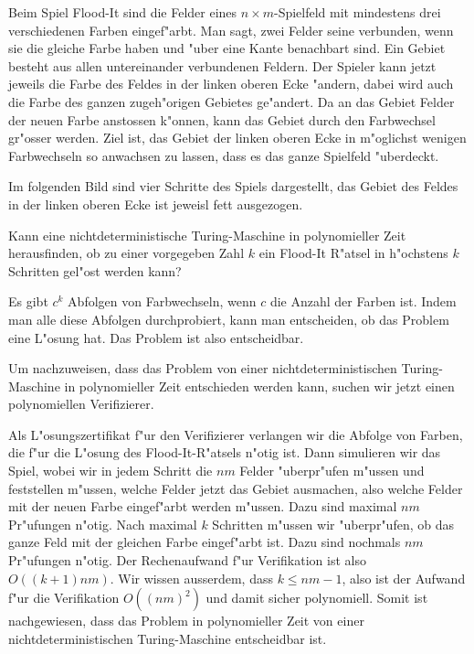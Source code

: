 Beim Spiel Flood-It sind die Felder eines $n\times m$-Spielfeld mit 
mindestens drei verschiedenen Farben eingef"arbt.
Man sagt, zwei Felder seine verbunden, wenn sie die gleiche Farbe
haben und "uber eine Kante benachbart sind.
Ein Gebiet besteht aus allen untereinander verbundenen Feldern.
Der Spieler kann jetzt jeweils die Farbe des Feldes in der linken
oberen Ecke "andern, dabei wird auch die Farbe des ganzen zugeh"origen
Gebietes ge"andert.
Da an das Gebiet Felder der neuen Farbe anstossen k"onnen, kann das
Gebiet durch den Farbwechsel gr"osser werden.
Ziel ist, das Gebiet der linken oberen Ecke in m"oglichst wenigen
Farbwechseln so anwachsen zu lassen, dass es das ganze Spielfeld "uberdeckt.

Im folgenden Bild sind vier Schritte des Spiels dargestellt, das Gebiet
des Feldes in der linken oberen Ecke ist jeweisl fett ausgezogen.
\begin{center}
\end{center}
Kann eine nichtdeterministische Turing-Maschine in polynomieller Zeit 
herausfinden, ob zu einer vorgegeben Zahl $k$ ein Flood-It
R"atsel in h"ochstens $k$ Schritten gel"ost werden kann?

\begin{loesung}
Es gibt $c^k$ Abfolgen von Farbwechseln, wenn $c$ die Anzahl der Farben ist.
Indem man alle diese Abfolgen durchprobiert, kann man entscheiden, ob
das Problem eine L"osung hat.
Das Problem ist also entscheidbar.

Um nachzuweisen, dass das Problem von einer nichtdeterministischen
Turing-Maschine in polynomieller Zeit entschieden werden kann,
suchen wir jetzt einen polynomiellen Verifizierer.

Als L"osungszertifikat f"ur den Verifizierer verlangen wir die Abfolge
von Farben, die f"ur die L"osung des Flood-It-R"atsels n"otig ist.
Dann simulieren wir das Spiel, wobei wir in jedem Schritt
die $nm$ Felder "uberpr"ufen m"ussen und feststellen m"ussen, welche
Felder jetzt das Gebiet ausmachen, also welche Felder mit der neuen
Farbe eingef"arbt werden m"ussen.
Dazu sind maximal $nm$ Pr"ufungen n"otig.
Nach maximal $k$ Schritten m"ussen wir "uberpr"ufen, ob das ganze Feld
mit der gleichen Farbe eingef"arbt ist.
Dazu sind nochmals $nm$ Pr"ufungen n"otig.
Der Rechenaufwand f"ur Verifikation ist also $O((k+1)nm)$.
Wir wissen ausserdem, dass $k\le nm-1$, also ist der Aufwand f"ur die
Verifikation $O((nm)^2)$ und damit sicher polynomiell.
Somit ist nachgewiesen, dass das Problem in polynomieller Zeit von
einer nichtdeterministischen Turing-Maschine entscheidbar ist.
\end{loesung}

